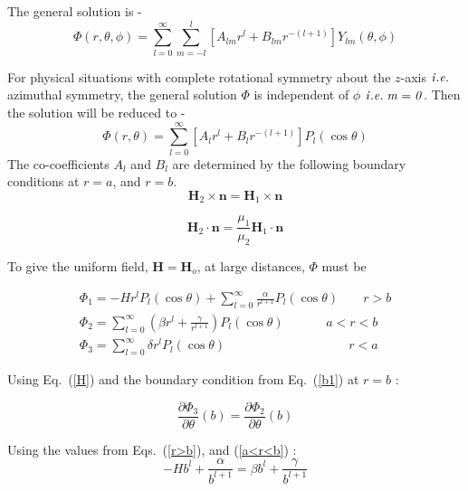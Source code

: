 The general solution is -
\begin{equation}
\Phi(r,\theta, \phi)=\sum_{l=0}^{\infty}\sum_{m=-l}^l [A_{lm}r^l+B_{lm}r^{-(l+1)}]Y_{lm}(\theta, \phi)
\end{equation}

For physical situations with complete rotational symmetry about the $z$-axis $\it{i.e.}$ azimuthal symmetry, the general solution $\Phi$ is independent of $\phi$ $\it{i.e.}\;m=0$. Then the solution will be reduced to -
\begin{equation}
\Phi(r,\theta)=\sum_{l=0}^{\infty} [A_lr^l+B_lr^{-(l+1)}]P_l(\cos\theta)
\end{equation}
The co-coefficients $A_l$ and $B_l$ are determined by the following boundary conditions at $r=a$, and $r=b$.
\begin{equation}\label{b1}   
\bm{H}_2\times \bm{n} = \bm{H}_1\times \bm{n}  
\end{equation}

\begin{equation}\label{b2}   
\bm{H}_2\cdot \bm{n}=\frac{\mu_{1}}{\mu_{2}}\bm{H}_1\cdot \bm{n}
\end{equation}


To give the uniform field, $\bm{H}=\bm{H}_o$, at large distances, $\Phi$ must be

\begin{align}
    \Phi_1=-Hr^lP_l(\cos\theta)+\sum_{l=0}^{\infty}\frac{\alpha}{r^{l+1}}P_l(\cos\theta)\;\;\;\;\;\;\;r>b \label{r>b} \\
    \Phi_2=\sum_{l=0}^{\infty} \left(\beta r^l+\frac{\gamma}{r^{l+1}}\right)P_l(\cos\theta)\;\;\;\;\;\;\;\;\;\;\;\;a<r<b \label{a<r<b} \\
    \Phi_3=\sum_{l=0}^{\infty} \delta r^l P_l(\cos\theta)\;\;\;\;\;\;\;\;\;\;\;\;\;\;\;\;\;\;\;\;\;\;\;\;\;\;\;\;\;\;\;\;\;\;\;r<a \label{r<a} 
\end{align}


Using Eq.~(\ref{H}) and the boundary condition from Eq.~(\ref{b1}) at $r=b$ :

$$\frac{\partial \Phi_3}{\partial \theta}(b)=\frac{\partial \Phi_2}{\partial \theta}(b)$$

Using the values from Eqs.~(\ref{r>b}), and (\ref{a<r<b}) :
\begin{equation}\label{e01}
-Hb^l+\frac{\alpha}{b^{l+1}}=\beta b^l+\frac{\gamma}{b^{l+1}}
\end{equation}

